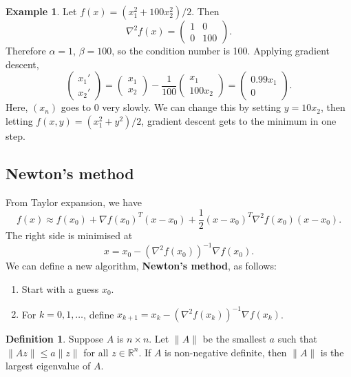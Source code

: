 \documentclass[12pt]{article}
\theoremstyle{definition}
\newtheorem{definition}{Definition}[section]
\newtheorem{example}{Example}[section]
\theoremstyle{remark}
\begin{document}
\begin{adjustbox}{minipage = \columnwidth - 25.5pt, margin=1em, frame=1pt, margin=0em}
\begin{example}
	Let $f(x) = (x_1^2 + 100x_2^2)/2$. Then
	\[
		\nabla^2 f(x) =
		\begin{pmatrix}
			1 & 0 \\
			0 & 100
		\end{pmatrix}
	.\]
	Therefore $\alpha = 1$, $\beta = 100$, so the condition number is 100. Applying gradient descent,
	\[
	\begin{pmatrix}
		x_1' \\
		x_2'
	\end{pmatrix}
	=
	\begin{pmatrix}
		x_1 \\
		x_2
	\end{pmatrix}
	- \frac{1}{100}
	\begin{pmatrix}
		x_1 \\
		100 x_2
	\end{pmatrix}
	=
	\begin{pmatrix}
		0.99x_1 \\
		0
	\end{pmatrix}
	.\] 
	Here, $(x_n)$ goes to 0 very slowly. We can change this by setting $y = 10x_2$, then letting $f(x, y) = (x_1^2 + y^2)/2$, gradient descent gets to the minimum in one step.
\end{example}

\end{adjustbox}

\subsection{Newton's method}%
\label{sub:newton_s_method}

From Taylor expansion, we have
\[
	f(x) \approx f(x_0) + \nabla f(x_0)^{T} (x - x_0) + \frac{1}{2} (x - x_0)^{T} \nabla^2 f(x_0) (x - x_0)
.\]
The right side is minimised at
\[
	x = x_0 - (\nabla^2 f(x_0))^{-1} \nabla f(x_0)
.\]
We can define a new algorithm, \textbf{Newton's method}, as follows:
\begin{enumerate}[1)]
	\item Start with a guess $x_0$.
	\item For $k = 0, 1, \ldots$, define $x_{k+1} = x_k - (\nabla^2 f(x_k))^{-1} \nabla f(x_k)$.
\end{enumerate}

\begin{definition}
	Suppose $A$ is $n \times n$. Let $\|A\|$ be the smallest $a$ such that $\|Az\| \leq a \|z\|$ for all $z \in \mathbb{R}^{n}$. If $A$ is non-negative definite, then $\|A\|$ is the largest eigenvalue of $A$.
\end{definition}
\end{document}
